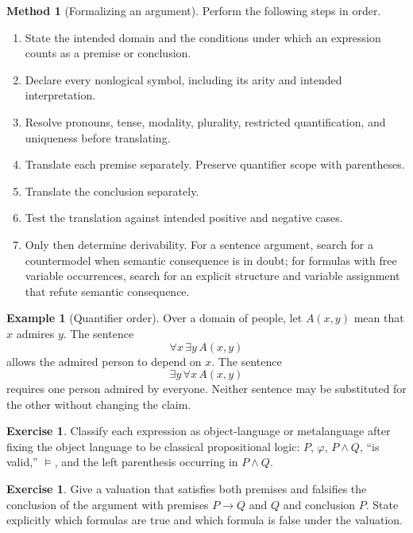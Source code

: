 \documentclass[11pt,oneside,openany]{book}
\theoremstyle{definition}
\newtheorem{example}[definition]{Example}
\newtheorem{exercise}[definition]{Exercise}
\newtheorem{method}[definition]{Method}
\theoremstyle{plain}
\theoremstyle{remark}
\newcommand{\entails}{\models}
\begin{document}
\begin{method}[Formalizing an argument]
Perform the following steps in order.
\begin{enumerate}
  \item State the intended domain and the conditions under which an expression
        counts as a premise or conclusion.
  \item Declare every nonlogical symbol, including its arity and intended
        interpretation.
  \item Resolve pronouns, tense, modality, plurality, restricted quantification,
        and uniqueness before translating.
  \item Translate each premise separately.  Preserve quantifier scope with
        parentheses.
  \item Translate the conclusion separately.
  \item Test the translation against intended positive and negative cases.
  \item Only then determine derivability.  For a sentence argument, search for
        a countermodel when semantic consequence is in doubt; for formulas
        with free variable occurrences, search for an explicit structure and
        variable assignment that refute semantic consequence.
\end{enumerate}
\end{method}

\begin{example}[Quantifier order]
Over a domain of people, let \(A(x,y)\) mean that \(x\) admires \(y\).
The sentence
\[
  \forall x\,\exists y\,A(x,y)
\]
allows the admired person to depend on \(x\).  The sentence
\[
  \exists y\,\forall x\,A(x,y)
\]
requires one person admired by everyone.  Neither sentence may be substituted
for the other without changing the claim.
\end{example}

\begin{exercise}
\label{ex:levels-01}
Classify each expression as object-language or metalanguage after fixing the
object language to be classical propositional logic: \(P\), \(\varphi\),
\(P\land Q\), ``is valid,'' \(\entails\), and the left parenthesis occurring in
\(P\land Q\).
\end{exercise}

\begin{exercise}
\label{ex:levels-02}
Give a valuation that satisfies both premises and falsifies the conclusion
of the argument with premises \(P\to Q\) and \(Q\) and conclusion
\(P\).  State explicitly which formulas
are true and which formula is false under the valuation.
\end{exercise}
\end{document}
